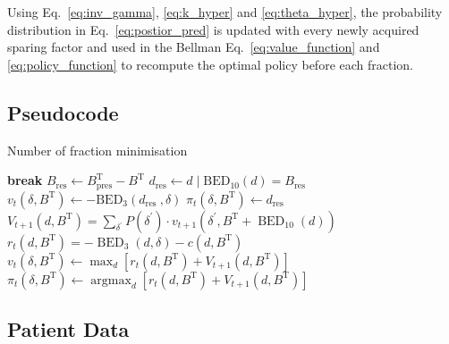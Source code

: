 \documentclass[\relativeRoot/ada.tex]{subfiles}
\begin{document}
Using Eq.~\eqref{eq:inv_gamma}, \eqref{eq:k_hyper} and \eqref{eq:theta_hyper}, the probability distribution in Eq.~\eqref{eq:postior_pred} is updated with every newly acquired sparing factor and used in the Bellman Eq.~\eqref{eq:value_function} and \eqref{eq:policy_function} to recompute the optimal policy before each fraction.






\onecolumn
\newpage
\clearpage
\pagestyle{empty}

\subsection{Pseudocode}\label{sec:pseudocode}

\begin{algorithm}[!htb]
    \caption{Number of fraction minimisation}
    \begin{algorithmic}
         
         
            \State \textbf{break}
            \State $B_{\text{res}} \gets B_{\text{pres}}^\text{T} - B^\text{T}$ 
            \State $d_{\text{res}} \gets d \mid \mathrm{BED}_{10}(d)=B_{\text{res}}$ 
            \State $v_t \left(\delta, B^{\text{T}}\right) \leftarrow-\mathrm{BED}_{3}\left(d_{\text {res }}, \delta\right)$ 
            \State $\pi_t \left(\delta, B^{\text{T}}\right) \leftarrow d_{\text {res }}$ 
        \Else
            \State $V_{t+1}\left(d, B^{\text{T}}\right) = \sum_{\delta^{\prime}} P(\delta^{\prime}) \cdot v_{t+1}\left(\delta^{\prime}, B^{\text{T}}+\operatorname{BED}_{10}(d)\right)$ 
            \State $r_{t}\left(d, B^{\text{T}}\right) = -\operatorname{BED}_{3}(d, \delta) - c(d, B^{\text{T}})$ 
            \State $v_t \left(\delta, B^{\text{T}}\right) \gets \max _{d}\left[ r_t(d, B^{\text{T}}) + V_{t+1}(d, B^{\text{T}})\right]$ 
            \State $\pi_t \left(\delta, B^{\text{T}}\right) \gets \operatorname{argmax}_{d}\left[r_t(d, B^{\text{T}}) + V_{t+1}(d, B^{\text{T}}) \right]$
        \EndIf
        \EndFor
    \end{algorithmic}
\end{algorithm}



\subsection{Patient Data}


    
\end{document}

